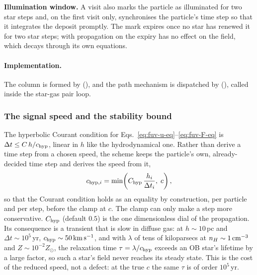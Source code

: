 \textbf{Illumination window.} A visit also marks the particle as
illuminated for two star steps and, on the first visit only,
synchronises the particle's time step so that it integrates the deposit
promptly. The mark expires once no star has renewed it for two star
steps; with propagation on the expiry has no effect on the field, which
decays through its own equations.

\paragraph{Implementation.} The column is formed by
(), and the path mechanism is
dispatched by 
(), called inside the star-gas pair loop.

\subsubsection{The signal speed and the stability bound}
\label{sec:fuv-chyp}

The hyperbolic Courant condition for
Eqs.~\ref{eq:fuv-u-eq}--\ref{eq:fuv-F-eq} is $\Delta t \le C\,h/c_{\rm
hyp}$, linear in $h$ like the hydrodynamical one. Rather than derive a
time step from a chosen speed, the scheme keeps the particle's own,
already-decided time step and derives the speed from it,
\begin{equation}
  c_{{\rm hyp},i} = \min\!\left(C_{\rm hyp}\,\frac{h_i}{\Delta t_i},\; c\right) ,
  \label{eq:fuv-chyp}
\end{equation}
so that the Courant condition holds as an equality by construction, per
particle and per step, before the clamp at $c$. The clamp can only make
a step more conservative. $C_{\rm hyp}$ (default $0.5$) is the one
dimensionless dial of the propagation. Its consequence is a transient
that is slow in diffuse gas: at $h\sim10$\,pc and $\Delta t\sim10^5$\,yr,
$c_{\rm hyp}\sim 50\,{\rm km\,s^{-1}}$, and with $\lambda$ of tens of
kiloparsecs at $n_H\sim1\,{\rm cm^{-3}}$ and $Z\sim10^{-2}Z_\odot$, the
relaxation time $\tau = \lambda/c_{\rm hyp}$ exceeds an OB star's
lifetime by a large factor, so such a star's field never reaches its
steady state. This is the cost of the reduced speed, not a defect: at
the true $c$ the same $\tau$ is of order $10^5$\,yr.

